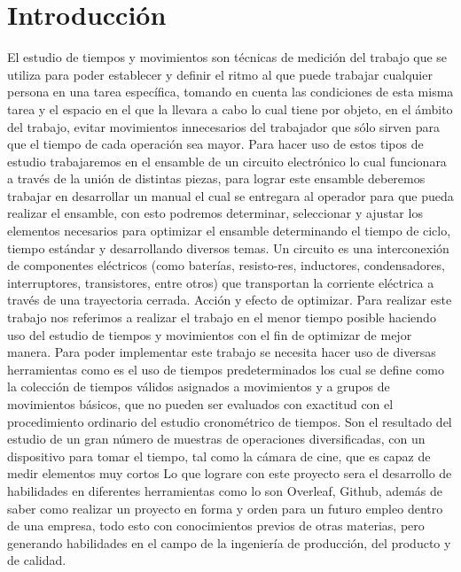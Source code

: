     \section{Introducción}
        El estudio de tiempos y movimientos son técnicas  de medición del trabajo que se utiliza para poder establecer y definir el ritmo al que puede trabajar cualquier persona en una tarea específica, tomando en cuenta las condiciones de esta misma tarea y el espacio en el que la llevara a cabo lo cual tiene por objeto, en el ámbito del trabajo, evitar movimientos innecesarios del trabajador que sólo sirven para que el tiempo de cada operación sea mayor. \cite{Estudiodetiempos} \cite{Estudiodemovimientos}
        Para hacer uso de estos tipos de estudio trabajaremos en el ensamble de un circuito electrónico lo cual funcionara a través de la unión de distintas piezas, para lograr este ensamble deberemos trabajar en desarrollar un manual el cual se entregara al operador para que pueda realizar el ensamble, con esto podremos determinar, seleccionar y ajustar los elementos necesarios para optimizar el ensamble determinando el tiempo de ciclo, tiempo estándar y desarrollando diversos temas. \cite{Ensamble} 
        Un circuito es una interconexión de componentes eléctricos (como baterías, resisto-res, inductores, condensadores, interruptores, transistores, entre otros) que transportan la corriente eléctrica a través de una trayectoria cerrada.\cite{Circuitoelectronico}
        Acción y efecto de optimizar. Para realizar este trabajo nos referimos a realizar el trabajo en el menor tiempo posible haciendo uso del estudio de tiempos y movimientos con el fin de optimizar de mejor manera.
        Para poder implementar este trabajo se necesita hacer uso de diversas herramientas como es el uso de tiempos predeterminados los cual se define como la colección de tiempos válidos asignados a movimientos y a grupos de movimientos básicos, que no pueden ser evaluados con exactitud con el procedimiento ordinario del estudio cronométrico de tiempos. Son el resultado del estudio de un gran número de muestras de operaciones diversificadas, con un dispositivo para tomar el tiempo, tal como la cámara de cine, que es capaz de medir elementos muy cortos 
        \cite{Tiempospredeterminados}
        Lo que lograre con este proyecto sera el desarrollo de habilidades en diferentes herramientas como lo son Overleaf, Github, además de saber como realizar un proyecto en forma y orden para un futuro empleo dentro de una empresa, todo esto con conocimientos previos de otras materias, pero generando habilidades en el campo de la ingeniería de producción, del producto y de calidad.
